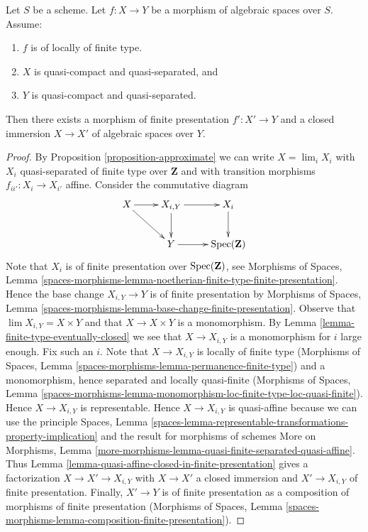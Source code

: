 \begin{lemma}
\label{lemma-finite-type-closed-in-finite-presentation}
Let $S$ be a scheme. Let $f : X \to Y$ be a morphism of algebraic spaces
over $S$. Assume:
\begin{enumerate}
\item $f$ is of locally of finite type.
\item $X$ is quasi-compact and quasi-separated, and
\item $Y$ is quasi-compact and quasi-separated.
\end{enumerate}
Then there exists a morphism of finite presentation
$f' : X' \to Y$ and a closed immersion $X \to X'$ of
algebraic spaces over $Y$.
\end{lemma}

\begin{proof}
By Proposition \ref{proposition-approximate}
we can write $X = \lim_i X_i$ with $X_i$ quasi-separated of finite type over
$\mathbf{Z}$ and with transition morphisms $f_{ii'} : X_i \to X_{i'}$ affine.
Consider the commutative diagram
$$
\xymatrix{
X \ar[r] \ar[rd] & X_{i, Y} \ar[r] \ar[d] & X_i \ar[d] \\
& Y \ar[r] & \Spec(\mathbf{Z})
}
$$
Note that $X_i$ is of finite presentation over $\mathop{\mathrm{Spec}}(\mathbf{Z})$, see
Morphisms of Spaces, Lemma
\ref{spaces-morphisms-lemma-noetherian-finite-type-finite-presentation}.
Hence the base change $X_{i, Y} \to Y$ is of finite presentation by
Morphisms of Spaces, Lemma
\ref{spaces-morphisms-lemma-base-change-finite-presentation}.
Observe that $\lim X_{i, Y} = X \times Y$ and that $X \to X \times Y$ is a
monomorphism. By Lemma \ref{lemma-finite-type-eventually-closed}
we see that $X \to X_{i, Y}$ is a monomorphism for $i$ large enough.
Fix such an $i$. Note that $X \to X_{i, Y}$ is locally of finite type
(Morphisms of Spaces, Lemma
\ref{spaces-morphisms-lemma-permanence-finite-type})
and a monomorphism, hence separated and locally quasi-finite
(Morphisms of Spaces, Lemma
\ref{spaces-morphisms-lemma-monomorphism-loc-finite-type-loc-quasi-finite}).
Hence $X \to X_{i, Y}$ is representable.
Hence $X \to X_{i, Y}$ is quasi-affine because we can use the
principle Spaces, Lemma
\ref{spaces-lemma-representable-transformations-property-implication}
and the result for morphisms of schemes More on Morphisms, Lemma
\ref{more-morphisms-lemma-quasi-finite-separated-quasi-affine}.
Thus Lemma \ref{lemma-quasi-affine-closed-in-finite-presentation}
gives a factorization $X \to X' \to X_{i, Y}$
with $X \to X'$ a closed immersion and $X' \to X_{i, Y}$ of finite
presentation. Finally, $X' \to Y$ is of finite presentation as a
composition of morphisms of finite presentation
(Morphisms of Spaces, Lemma
\ref{spaces-morphisms-lemma-composition-finite-presentation}).
\end{proof}

